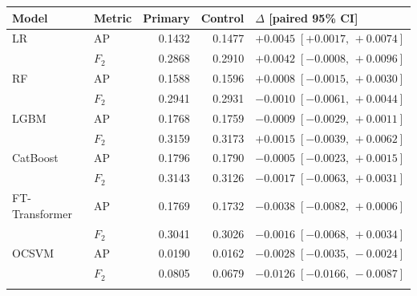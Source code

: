 \begingroup
\setlength{\tabcolsep}{3pt}
\begin{tabular}{l l r r l}
\toprule
Model & Metric & Primary & Control & $\Delta$ [paired 95\% CI] \\
\midrule
LR & AP & 0.1432 & 0.1477 & $+0.0045\;[+0.0017,\,+0.0074]$ \\
 & $F_2$ & 0.2868 & 0.2910 & $+0.0042\;[-0.0008,\,+0.0096]$ \\
\addlinespace[3pt]
RF & AP & 0.1588 & 0.1596 & $+0.0008\;[-0.0015,\,+0.0030]$ \\
 & $F_2$ & 0.2941 & 0.2931 & $-0.0010\;[-0.0061,\,+0.0044]$ \\
\addlinespace[3pt]
LGBM & AP & 0.1768 & 0.1759 & $-0.0009\;[-0.0029,\,+0.0011]$ \\
 & $F_2$ & 0.3159 & 0.3173 & $+0.0015\;[-0.0039,\,+0.0062]$ \\
\addlinespace[3pt]
CatBoost & AP & 0.1796 & 0.1790 & $-0.0005\;[-0.0023,\,+0.0015]$ \\
 & $F_2$ & 0.3143 & 0.3126 & $-0.0017\;[-0.0063,\,+0.0031]$ \\
\addlinespace[3pt]
FT-Transformer & AP & 0.1769 & 0.1732 & $-0.0038\;[-0.0082,\,+0.0006]$ \\
 & $F_2$ & 0.3041 & 0.3026 & $-0.0016\;[-0.0068,\,+0.0034]$ \\
\addlinespace[3pt]
OCSVM & AP & 0.0190 & 0.0162 & $-0.0028\;[-0.0035,\,-0.0024]$ \\
 & $F_2$ & 0.0805 & 0.0679 & $-0.0126\;[-0.0166,\,-0.0087]$ \\
\addlinespace[3pt]
\bottomrule
\end{tabular}
\endgroup
